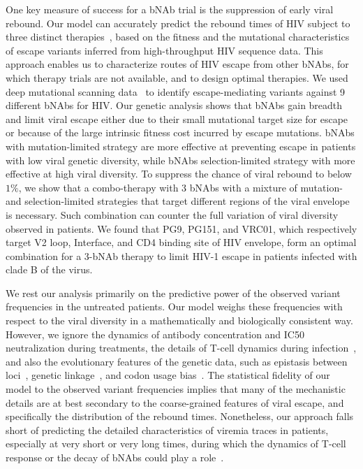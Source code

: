 \documentclass[aps,prx,noshowpacs,twocolumn,nofootinbib]{revtex4-2}
\begin{document}
One key measure of  success for a bNAb trial is the suppression of early viral rebound. Our model can accurately predict the rebound times of HIV subject to three distinct therapies~\cite{Caskey:2015hm,Caskey:2017el,bar-onSafetyAntiviralActivity2018},  based on the fitness and the mutational characteristics of escape variants inferred from high-throughput HIV sequence data. This approach enables us to characterize routes of HIV escape  from other bNAbs, for which therapy trials are not available,   and to design optimal therapies. We used deep mutational scanning data~\cite{Dingens:2019fd} to identify escape-mediating variants against 9 different bNAbs for HIV. Our genetic analysis shows that bNAbs gain breadth and limit viral escape either due to their small mutational target size for escape or because of the large intrinsic fitness cost  incurred by  escape mutations. bNAbs with mutation-limited strategy are more effective at preventing escape in patients with low viral genetic diversity, while bNAbs selection-limited strategy with more effective at high viral diversity. To suppress the chance of viral rebound  to below  $1\%$, we show that a combo-therapy with 3 bNAbs with a mixture of mutation- and selection-limited strategies that target different regions of the viral envelope is necessary. Such combination can counter the full variation of viral diversity observed in patients. We found that  PG9, PG151, and VRC01, which respectively target V2 loop, Interface, and CD4 binding site of HIV envelope, form an optimal combination for a 3-bNAb therapy to limit HIV-1 escape in patients infected with clade B of the virus. 


We rest our analysis primarily on the predictive power of the  observed variant frequencies in the untreated patients. Our model weighs these frequencies with respect to the viral diversity in a mathematically and biologically consistent way.  However, we ignore the dynamics of antibody concentration and IC50 neutralization during treatments, the details of T-cell dynamics during infection~\cite{Perelson:2002kw}, and also the evolutionary features of the genetic data, such as epistasis between loci~\cite{Bonhoeffer:2004cf,Zhang:2020bs}, genetic linkage~\cite{Zanini:2015gg}, and codon usage bias~\cite{Meintjes:2005ji}. The statistical fidelity of our model to the observed variant frequencies implies that many of the mechanistic details are at best secondary to the coarse-grained features  of  viral escape, and specifically the distribution of the rebound times. Nonetheless, our approach falls short of predicting the detailed characteristics of viremia traces in patients, especially at very short or very long times,  during which the dynamics of T-cell response or the decay of bNAbs could play a role~\cite{Lu:2016id,Reeves:2020ca,Saha:2020fd}. 
\end{document}

